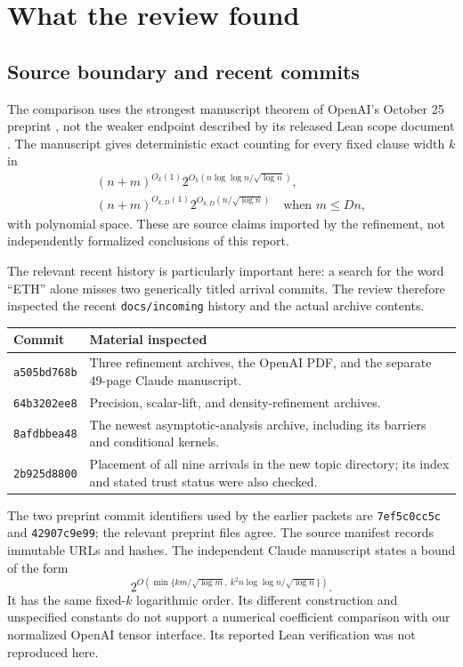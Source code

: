 \documentclass[11pt]{article}
\theoremstyle{remark}\newtheorem{remark}[theorem]{Remark}
\begin{document}
\section{What the review found}
\label{sec:review}

\subsection{Source boundary and recent commits}
The comparison uses the strongest manuscript theorem of OpenAI's October 25 preprint \cite{source}, not the weaker endpoint described by its released Lean scope document \cite{scope}. The manuscript gives deterministic exact counting for every fixed clause width $k$ in
\begin{align}
 (n+m)^{O_k(1)}2^{O_k(n\log\log n/\sqrt{\log n})},
 \label{eq:sat-general}\\
 (n+m)^{O_{k,D}(1)}2^{O_{k,D}(n/\sqrt{\log n})}
 \quad\text{when }m\le Dn,
 \label{eq:sat-sparse}
\end{align}
with polynomial space. These are source claims imported by the refinement, not independently formalized conclusions of this report.

The relevant recent history is particularly important here: a search for the word ``ETH'' alone misses two generically titled arrival commits. The review therefore inspected the recent \texttt{docs/incoming} history and the actual archive contents.

\begin{center}\small
\begin{tabular}{@{}p{}p{}@{}}
\toprule
Commit & Material inspected\\\midrule
\texttt{a505bd768b} & Three refinement archives, the OpenAI PDF, and the separate 49-page Claude manuscript.\\
\texttt{64b3202ee8} & Precision, scalar-lift, and density-refinement archives.\\
\texttt{8afdbbea48} & The newest asymptotic-analysis archive, including its barriers and conditional kernels.\\
\texttt{2b925d8800} & Placement of all nine arrivals in the new topic directory; its index and stated trust status were also checked.\\
\bottomrule
\end{tabular}
\end{center}

The two preprint commit identifiers used by the earlier packets are \texttt{7ef5c0cc5c} and \texttt{42907c9e99}; the relevant preprint files agree. The source manifest records immutable URLs and hashes. The independent Claude manuscript states a bound of the form
\[
 2^{O(\min\{km/\sqrt{\log m},\ k^2n\log\log n/\sqrt{\log n}\})}.
\]
It has the same fixed-$k$ logarithmic order. Its different construction and unspecified constants do not support a numerical coefficient comparison with our normalized OpenAI tensor interface. Its reported Lean verification was not reproduced here.
\end{document}

